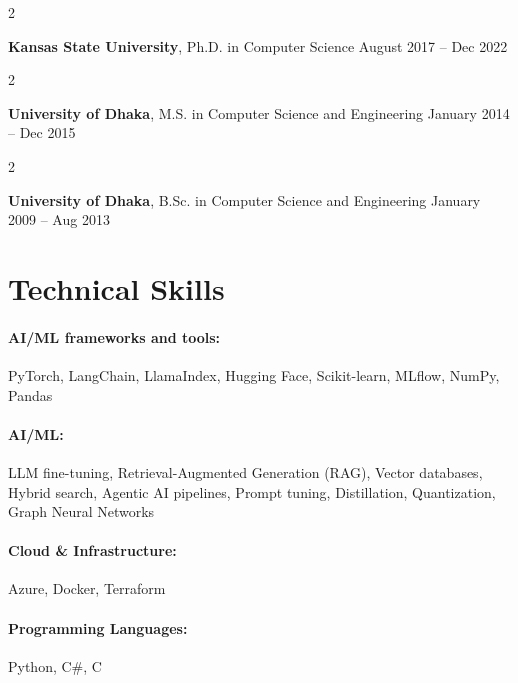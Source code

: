 \documentclass[10pt, letterpaper]{article}
\newenvironment{twocolentry}[2][]{
    \onecolentry
    \def\secondColumn{#2}
    \setcolumnwidth{\fill, 4.5 cm}
    \begin{paracol}{2}
}{
    \switchcolumn \raggedleft \secondColumn
    \end{paracol}
    \endonecolentry
} %
\begin{document}
        \begin{twocolentry}{
            August 2017 -- Dec 2022
        }
            \textbf{Kansas State University}, Ph.D. in Computer Science\end{twocolentry}

        \begin{twocolentry}{
            January 2014 -- Dec 2015
        }
            \textbf{University of Dhaka}, M.S. in Computer Science and Engineering\end{twocolentry}

        \begin{twocolentry}{
            January 2009 -- Aug 2013
        }
            \textbf{University of Dhaka}, B.Sc. in Computer Science and Engineering\end{twocolentry}

\vspace{-1mm}
\section{Technical Skills}

        \paragraph{AI/ML frameworks and tools:} PyTorch, LangChain, LlamaIndex, Hugging Face, Scikit-learn, MLflow, NumPy, Pandas
        \vspace{-4mm}
        \paragraph{AI/ML:} LLM fine-tuning, Retrieval-Augmented Generation (RAG), Vector databases, Hybrid search, Agentic AI pipelines, Prompt tuning, Distillation, Quantization, Graph Neural Networks
        \vspace{-4mm}
        \paragraph{Cloud \& Infrastructure:} Azure, Docker, Terraform
        \vspace{-4mm}
        \paragraph{Programming Languages:} Python, C\#, C
\end{document}
